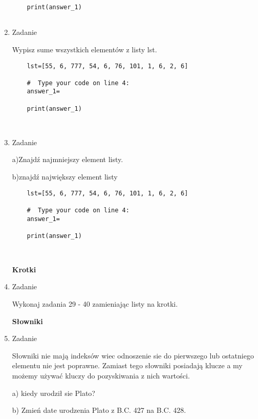 \documentclass[11pt]{article}
\begin{document}
\begin{enumerate}
\begin{lstlisting}
	print(answer_1)
	
\end{lstlisting}


	\item
\begin{Large}
	Zadanie
\end{Large}
\par
Wypisz sume wszystkich elementów z listy lst.
\begin{lstlisting}	
	lst=[55, 6, 777, 54, 6, 76, 101, 1, 6, 2, 6]
	
	#  Type your code on line 4:
	answer_1=
	
	print(answer_1)
	
	
\end{lstlisting}


	\item
\begin{Large}
	Zadanie
\end{Large}
\par
a)Znajdź najmniejszy element listy.
\par
b)znajdź największy element listy
\begin{lstlisting}	
	lst=[55, 6, 777, 54, 6, 76, 101, 1, 6, 2, 6]
	
	#  Type your code on line 4:
	answer_1=
	
	print(answer_1)
	
	
\end{lstlisting}


		

\medskip
\begin{Large}
	\textbf{Krotki}
\end{Large}

\item 
\begin{Large}
	Zadanie
\end{Large}
 \par 
 Wykonaj zadania 29 - 40  zamieniając listy na krotki.
 
 \medskip
 \begin{Large}
 	\textbf{Słowniki}
 \end{Large}
 
 \item\begin{Large}
 	Zadanie
 \end{Large}
	\par
	Słowniki nie mają indeksów wiec odnoszenie sie do pierwszego lub ostatniego elementu nie jest poprawne. Zamiast tego słowniki posiadają klucze a my możemy używać kluczy do pozyskiwania z nich wartości.
	\par
	a) kiedy urodził sie Plato?
	\par
	b) Zmień date urodzenia Plato z  B.C. 427 na B.C. 428.
	

\end{enumerate}
\end{document}
